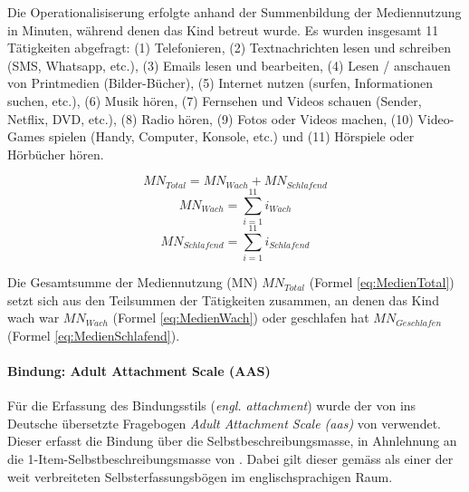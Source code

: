 Die Operationalisiserung erfolgte anhand der Summenbildung der Mediennutzung in Minuten, während denen das Kind betreut wurde. Es wurden insgesamt 11 Tätigkeiten abgefragt: (1) Telefonieren, (2) Textnachrichten lesen und schreiben (SMS, Whatsapp, etc.), (3) Emails lesen und bearbeiten, (4) Lesen / anschauen von Printmedien (Bilder-Bücher), (5) Internet nutzen (surfen, Informationen suchen, etc.), (6) Musik hören, (7) Fernsehen und Videos schauen (Sender, Netflix, DVD, etc.), (8) Radio hören, (9) Fotos oder Videos machen, (10) Video-Games spielen (Handy, Computer, Konsole, etc.) und (11) Hörspiele oder Hörbücher hören. 

\begin{equation}\label{eq:MedienTotal}
    MN_{Total}=MN_{Wach} + MN_{Schlafend}
\end{equation}
\begin{equation}\label{eq:MedienWach}
    MN_{Wach}=\sum_{i=1}^{11} i_{Wach}
\end{equation}
\begin{equation}\label{eq:MedienSchlafend}
    MN_{Schlafend}=\sum_{i=1}^{11} i_{Schlafend}
\end{equation}

Die Gesamtsumme der Mediennutzung (MN) $MN_{Total}$ (Formel \ref{eq:MedienTotal}) setzt sich aus den Teilsummen der Tätigkeiten zusammen, an denen das Kind wach war $MN_{Wach}$ (Formel \ref{eq:MedienWach}) oder geschlafen hat $MN_{Geschlafen}$ (Formel \ref{eq:MedienSchlafend}).



\paragraph{Bindung: Adult Attachment Scale (AAS)}\label{sec:AAS}
Für die Erfassung des Bindungsstils (\textit{engl. attachment}) wurde der von  ins Deutsche übersetzte Fragebogen \textit{Adult Attachment Scale (\acrshort{aas})} von  verwendet. Dieser erfasst die Bindung über die Selbst\-beschreibungs\-masse, in Ahnlehnung an die 1-Item-Selbst\-beschreibungs\-masse von . Dabei gilt dieser gemäss  als einer der weit verbreiteten Selbst\-er\-fassungs\-bögen im englisch\-sprachigen Raum.

